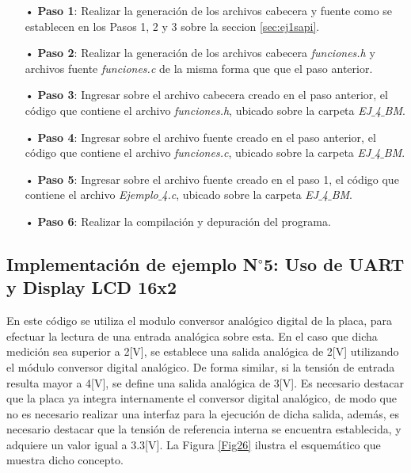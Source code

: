 \documentclass[12pt,letterpaper]{article}
\begin{document}
\begin{enumerate}
\item[•]\textbf{Paso 1}: Realizar la generación de los archivos cabecera y fuente como se establecen en los Pasos 1, 2 y 3 sobre la seccion \ref{sec:ej1sapi}.

\item[•]\textbf{Paso 2}: Realizar la generación de los archivos cabecera \textit{funciones.h} y archivos fuente \textit{funciones.c} de la misma forma que que el paso anterior.

\item[•]\textbf{Paso 3}: Ingresar sobre el archivo cabecera creado en el paso anterior, el código que contiene el archivo \textit{funciones.h}, ubicado sobre la carpeta \textit{EJ$\_$4$\_$BM}.

\item[•]\textbf{Paso 4}: Ingresar sobre el archivo fuente creado en el paso anterior, el código que contiene el archivo \textit{funciones.c}, ubicado sobre la carpeta \textit{EJ$\_$4$\_$BM}.

\item[•]\textbf{Paso 5}: Ingresar sobre el archivo fuente creado en el paso 1, el código que contiene el archivo \textit{Ejemplo$\_$4.c}, ubicado sobre la carpeta \textit{EJ$\_$4$\_$BM}.

\item[•]\textbf{Paso 6}: Realizar la compilación y depuración del programa.
\end{enumerate}


\subsection{Implementación de ejemplo N$^{\circ}$5: Uso de UART y Display LCD 16x2}\label{sec:ej5sapi}
En este código se utiliza el modulo conversor analógico digital de la placa, para efectuar la lectura de una entrada analógica sobre esta. En el caso que dicha medición sea superior a 2[V], se establece una salida analógica de 2[V] utilizando el módulo conversor digital analógico. De forma similar, si la tensión de entrada resulta mayor a 4[V], se define una salida analógica de 3[V].
Es necesario destacar que la placa ya integra internamente el conversor digital analógico, de modo que no es necesario realizar una interfaz para la ejecución de dicha salida, además, es necesario destacar que la tensión de referencia interna se encuentra establecida, y adquiere un valor igual a 3.3[V]. La Figura \ref{Fig26} ilustra el esquemático que muestra dicho concepto.
\end{document}
